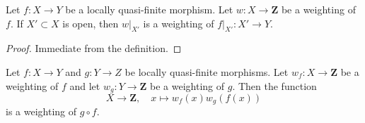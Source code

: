\begin{lemma}
\label{lemma-weighting-open}
Let $f : X \to Y$ be a locally quasi-finite morphism. Let
$w : X \to \mathbf{Z}$ be a weighting of $f$. If $X' \subset X$ is open,
then $w|_{X'}$ is a weighting of $f|_{X'} : X' \to Y$.
\end{lemma}

\begin{proof}
Immediate from the definition.
\end{proof}

\begin{lemma}
\label{lemma-weighting-composition}
Let $f : X \to Y$ and $g : Y \to Z$ be locally quasi-finite morphisms.
Let $w_f : X \to \mathbf{Z}$ be a weighting of $f$ and let
$w_g : Y \to \mathbf{Z}$ be a weighting of $g$. Then the function
$$
X \longrightarrow \mathbf{Z},\quad
x \longmapsto w_f(x) w_g(f(x))
$$
is a weighting of $g \circ f$.
\end{lemma}

